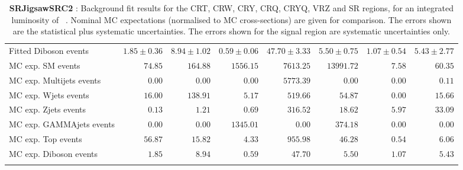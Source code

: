 \begin{table}
\begin{center}
{\begin{tabular*}{\textwidth}{@{\extracolsep{\fill}}lrrrrrrr}
        Fitted Diboson events         & $1.85 \pm 0.36$          & $8.94 \pm 1.02$          & $0.59 \pm 0.06$          & $47.70 \pm 3.33$          & $5.50 \pm 0.75$          & $1.07 \pm 0.54$          & $5.43 \pm 2.77$              \\
 \noalign{\smallskip}\hline\noalign{\smallskip}
MC exp. SM events              & $74.85$          & $164.88$          & $1556.15$          & $7613.25$          & $13991.72$          & $7.58$          & $60.35$              \\
\noalign{\smallskip}\hline\noalign{\smallskip}
        MC exp. Multijets events         & $0.00$          & $0.00$          & $0.00$          & $5773.39$          & $0.00$          & $0.00$          & $0.11$              \\
        MC exp. Wjets events         & $16.00$          & $138.91$          & $5.17$          & $519.66$          & $54.87$          & $0.00$          & $15.66$              \\
        MC exp. Zjets events         & $0.13$          & $1.21$          & $0.69$          & $316.52$          & $18.62$          & $5.97$          & $33.09$              \\
        MC exp. GAMMAjets events         & $0.00$          & $0.00$          & $1345.01$          & $0.00$          & $374.18$          & $0.00$          & $0.00$              \\
        MC exp. Top events         & $56.87$          & $15.82$          & $4.33$          & $955.98$          & $46.28$          & $0.54$          & $6.06$              \\
        MC exp. Diboson events         & $1.85$          & $8.94$          & $0.59$          & $47.70$          & $5.50$          & $1.07$          & $5.43$              \\
\noalign{\smallskip}\hline\noalign{\smallskip}
\end{tabular*}
}
\end{center}
\caption{{\bf SRJigsawSRC2} : Background fit results for the CRT, CRW, CRY, CRQ, CRYQ, VRZ and SR regions, for an integrated luminosity of \ourintlumi~\ifb. Nominal MC expectations (normalised to MC cross-sections) are given for comparison. The errors shown are the statistical plus systematic uncertainties. The errors shown for the signal region are systematic uncertainties only.}
\label{table.results.systematics.in.logL.fit.CRT.CRW.CRY.CRQ.CRYQ.VRZ.SR.SRJigsawSRC2}
\end{table}
%